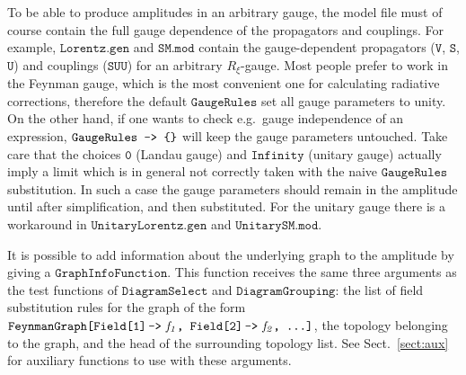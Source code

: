 \documentclass[twoside,12pt]{article}
\let\dots\textellipsis
\def\eg{e.g.\ }
\def\lbrac{\symbol{123}}
\def\rbrac{\symbol{125}}
\def\Brac#1{\lbrac#1\rbrac}
\def\Code#1{\ensuremath{\texttt{#1}}}
\def\Var#1{\ensuremath{\mathit{#1}}}
\begin{document}
To be able to produce amplitudes in an arbitrary gauge, the model file
must of course contain the full gauge dependence of the propagators and
couplings.  For example, \Code{Lorentz.gen} and \Code{SM.mod} contain the
gauge-dependent propagators (\Code{V}, \Code{S}, \Code{U}) and couplings
(\Code{SUU}) for an arbitrary $R_\xi$-gauge.  Most people prefer to work
in the Feynman gauge, which is the most convenient one for calculating
radiative corrections, therefore the default \Code{GaugeRules} set all
gauge parameters to unity.  On the other hand, if one wants to check
\eg gauge independence of an expression, \Code{GaugeRules -> \Brac{}}
will keep the gauge parameters untouched.  Take care that the choices
\Code{0} (Landau gauge) and \Code{Infinity} (unitary gauge) actually
imply a limit which is in general not correctly taken with the naive
\Code{GaugeRules} substitution.  In such a case the gauge parameters
should remain in the amplitude until after simplification, and then
substituted.  For the unitary gauge there is a workaround in
\Code{UnitaryLorentz.gen} and \Code{UnitarySM.mod}.%
%
%
%

It is possible to add information about the underlying graph to the 
amplitude by giving a \Code{GraphInfoFunction}.  This function receives 
the same three arguments as the test functions of \Code{DiagramSelect} 
and \Code{DiagramGrouping}: the list of field substitution rules for the 
graph of the form \Code{FeynmanGraph[Field[1]\,->\,\,\Var{f_1}, 
Field[2]\,->\,\,\Var{f_2}, \dots]}, the topology belonging to the graph, 
and the head of the surrounding topology list.  See Sect.~\ref{sect:aux} 
for auxiliary functions to use with these arguments.

\bigskip
\end{document}
